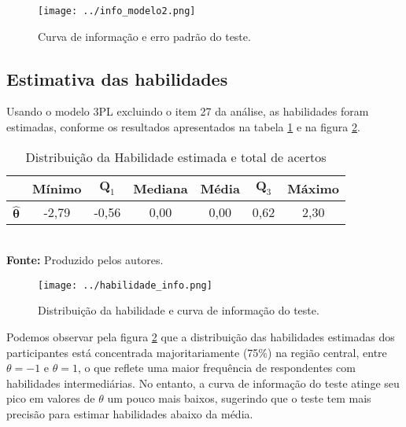 \begin{figure}[H]
	\centering
	\caption{Curva de informação e erro padrão do teste.}
	\texttt{[image: ../info\_modelo2.png]}
	\parbox{\textwidth}{
		\centering %
	}
	\label{fig:info}
\end{figure}


\subsection{Estimativa das habilidades}

Usando o modelo 3PL excluindo o item 27 da análise, as habilidades foram estimadas, conforme os resultados apresentados na tabela \ref{summary-habilidade} e na figura \ref{fig:info_habilidade}.


\begin{table}[H]		
	\centering
		\caption{Distribuição da Habilidade estimada e total de acertos}
		\label{summary-habilidade}
		\begin{tabular}{lcccccc}
			\hline
			& \textbf{Mínimo} & $\textbf{Q}_1$ & \textbf{Mediana} & \textbf{Média} & $\textbf{Q}_3$ & \textbf{Máximo} \\ 
			\hline
			$\boldsymbol{\hat{\theta}}$ & -2,79 & -0,56 & 0,00 & 0,00 & 0,62 & 2,30 \\ 
			\hline
		\end{tabular}\\
		\vspace*{0.5cm}
		\small{\textbf{Fonte:} Produzido pelos autores.}
\end{table}


\begin{figure}[H]
	\centering
	\caption{Distribuição da habilidade e curva de informação do teste.}
	\texttt{[image: ../habilidade\_info.png]}
		\parbox{\textwidth}{
		\centering %
	}
	\label{fig:info_habilidade}
\end{figure}

Podemos observar pela figura \ref{fig:info_habilidade} que a distribuição das habilidades estimadas dos participantes está concentrada majoritariamente (75\%) na região central, entre $\theta = -1$ e $\theta = 1$, o que reflete uma maior frequência de respondentes com habilidades intermediárias. No entanto, a curva de informação do teste atinge seu pico em valores de $\theta$ um pouco mais baixos, sugerindo que o teste tem mais precisão para estimar habilidades abaixo da média.

